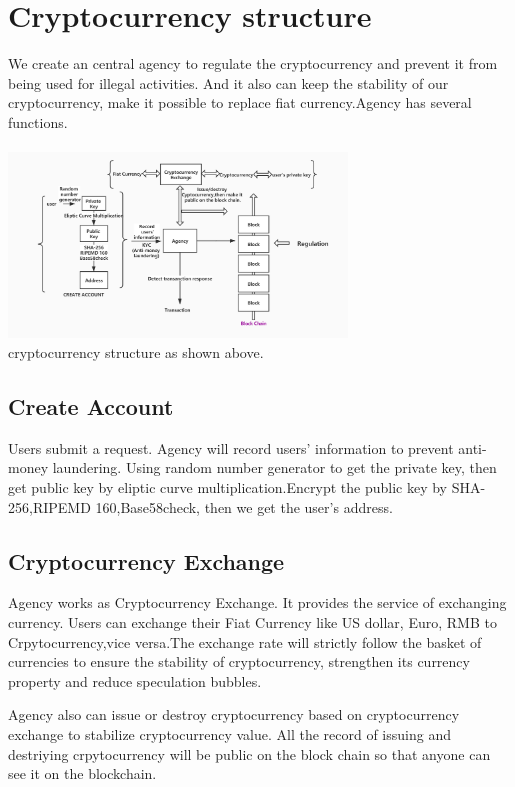 \documentclass[conference]{IEEEtran}
\begin{document}
\section{Cryptocurrency structure}
We create an central agency to regulate the cryptocurrency and prevent it from being used for illegal activities. And it also can keep the stability of our cryptocurrency, make it possible to replace fiat currency.Agency has several functions.
\\
\\
\includegraphics[width=9cm]{Zheng Liu.jpg}
\\
cryptocurrency structure as shown above\cite{zetzsche2019regulating}.

\subsection{Create Account}\label{AA}
Users submit a request. Agency will record users' information to prevent anti-money laundering. Using random number generator to get the private key, then get public key by eliptic curve multiplication.Encrypt the public key by SHA-256\cite{gilbert2003security},RIPEMD 160\cite{dobbertin1996ripemd},Base58check, then we get the user's address.

\subsection{Cryptocurrency Exchange}
Agency works as Cryptocurrency Exchange. It provides the service of exchanging currency. Users can exchange their Fiat Currency like US dollar, Euro, RMB to Crpytocurrency,vice versa.The exchange rate will strictly follow the basket of currencies to ensure the stability of cryptocurrency, strengthen its currency property and reduce speculation bubbles.

Agency also can issue or destroy cryptocurrency based on cryptocurrency exchange to stabilize cryptocurrency value. All the record of issuing and destriying crpytocurrency will be public on the block chain so that anyone can see it on the blockchain\cite{bohme2015bitcoin}.
\end{document}
